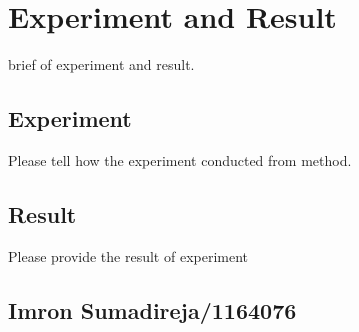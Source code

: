 \chapter{Experiment and Result}
brief of experiment and result.
\section{Experiment}
Please tell how the experiment conducted from method.



\section{Result}
Please provide the result of experiment

\section{Imron Sumadireja/1164076}
